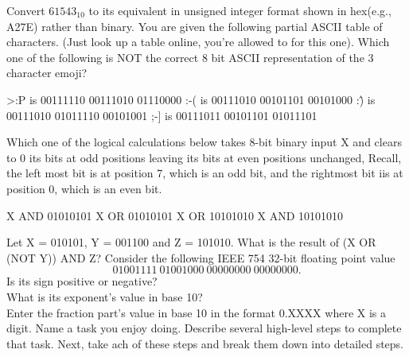 \documentclass[letterpaper]{exam}
\begin{document}
\begin{questions}
        \question Convert $61543_{10}$ to its equivalent in unsigned integer format shown in hex(e.g., A27E) rather than binary. 
        \question You are given the following partial ASCII table of characters. (Just look up a table online, you're allowed to for this one). Which one of the following is NOT the correct 8 bit ASCII representation of the 3 character emoji? 
        \begin{checkboxes}
            \choice >:P is 00111110 00111010 01110000
            \choice :-( is 00111010 00101101 00101000
            \choice :\^) is 00111010 01011110 00101001
            \choice ;-] is 00111011 00101101 01011101
        \end{checkboxes}
        \question Which one of the logical calculations below takes 8-bit binary input X and clears to 0 its bits at odd positions leaving its bits at even positions unchanged, Recall, the left most bit is at position 7, which is an odd bit, and the rightmost bit iis at position 0, which is an even bit. 
        \begin{checkboxes}
           \choice X AND 01010101
           \choice X OR 01010101
           \choice X OR 10101010
           \choice X AND 10101010
        \end{checkboxes}
       \question Let X = 010101, Y = 001100 and Z = 101010. What is the result of (X OR (NOT Y)) AND Z? 
       \question Consider the following IEEE 754 32-bit floating point value 
       \[
       01001111\ 01001000\ 00000000\ 00000000
       .\] 
       Is its sign positive or negative? \\
       What is its exponent's value in base 10?\\ Enter the fraction part's value in base 10 in the format 0.XXXX where X is a digit. 
       \question Name a task you enjoy doing. Describe several high-level steps to complete that task. Next, take ach of these steps and break them down into detailed steps.

   \end{questions}
\end{document}
